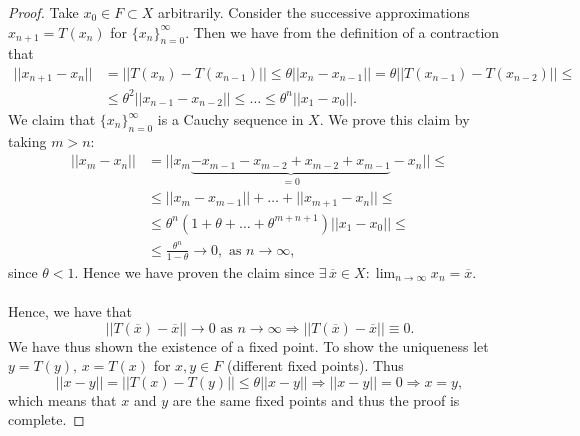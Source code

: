 \documentclass[12pt, a4paper]{article}
\begin{document}
\begin{proof}
Take $x_0\in F\subset X$ arbitrarily. Consider the successive approximations $x_{n+1} = T(x_n)$ for $\{x_n\}_{n=0}^\infty$. Then we have from the definition of a contraction that
\begin{equation*}
\begin{split}
||x_{n+1}-x_n|| &= ||T(x_n) - T(x_{n-1})|| \leq \theta || x_n - x_{n-1}|| =  \theta ||T(x_{n-1}) - T(x_{n-2})|| \leq \\
&\leq \theta^2 ||x_{n-1}-x_{n-2}|| \leq \dots \leq \theta^n ||x_1 - x_0||.
\end{split}
\end{equation*}
We claim that $\{x_n\}_{n=0}^\infty$ is a Cauchy sequence in $X$. We prove this claim by taking $m>n$:
\begin{equation*}
\begin{split}
||x_m-x_n|| &= ||x_m \underbrace{-x_{m-1}-x_{m-2}+x_{m-2}+x_{m-1}}_{=0} - x_n|| \leq \\
&\leq ||x_m-x_{m-1}|| + \dots + ||x_{m+1}-x_n|| \leq \\
& \leq \theta^n (1+\theta + \dots + \theta^{m+n+1})||x_1-x_0|| \leq \\
& \leq \frac{\theta^n}{1-\theta} \to 0, \text{ as } n \to \infty,
\end{split}
\end{equation*}
since $\theta<1$. Hence we have proven the claim since $\exists\, \overline{x}\in X : \lim_{n \to\infty} x_n = \overline{x}$.
\\\\
Hence, we have that
\begin{equation*}
||T(\overline{x})-\overline{x}|| \to 0 \text{ as } n\to\infty \Rightarrow ||T(\overline{x})-\overline{x}|| \equiv 0.
\end{equation*}
We have thus shown the existence of a fixed point. To show the uniqueness let $y=T(y),\, x=T(x)$ for $x,y\in F$ (different fixed points). Thus
\begin{equation*}
||x-y|| = ||T(x)-T(y)||\leq \theta ||x-y|| \Rightarrow ||x-y||=0 \Rightarrow x = y,
\end{equation*}
which means that $x$ and $y$ are the same fixed points and thus the proof is complete.
\end{proof}
\end{document}

